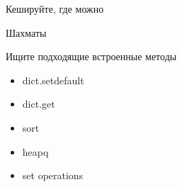 \documentclass{article}
\begin{document}
\begin{center}Кешируйте, где можно\end{center}
Шахматы
\newpage 

\begin{center}Ищите подходящие встроенные методы\end{center}
\begin{itemize}
    \item dict.setdefault
    \item dict.get
    \item sort
    \item heapq
    \item set operations
\end{itemize}
\newpage 
\end{document}
